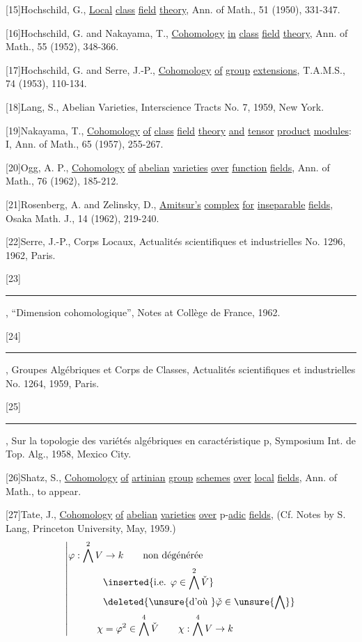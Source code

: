 [15]\quad Hochschild, G., \uline{Local} \uline{class} \uline{field} \uline{theory}, Ann. of Math., 51 (1950), 331-347.

[16]\quad Hochschild, G. and Nakayama, T., \uline{Cohomology} \uline{in} \uline{class} \uline{field} \uline{theory}, Ann. of Math., 55 (1952), 348-366.

[17]\quad Hochschild, G. and Serre, J.-P., \uline{Cohomology} \uline{of} \uline{group} \uline{extensions}, T.A.M.S., 74 (1953), 110-134.

[18]\quad Lang, S., Abelian Varieties, Interscience Tracts No. 7, 1959, New York.

[19]\quad Nakayama, T., \uline{Cohomology} \uline{of} \uline{class} \uline{field} \uline{theory} \uline{and} \uline{tensor} \uline{product} \uline{modules}: I, Ann. of Math., 65 (1957), 255-267.

[20]\quad Ogg, A. P., \uline{Cohomology} \uline{of} \uline{abelian} \uline{varieties} \uline{over} \uline{function} \uline{fields}, Ann. of Math., 76 (1962), 185-212.

[21]\quad Rosenberg, A. and Zelinsky, D., \uline{Amitsur's} \uline{complex} \uline{for} \uline{inseparable} \uline{fields}, Osaka Math. J., 14 (1962), 219-240.

[22]\quad Serre, J.-P., Corps Locaux, Actualités scientifiques et industrielles No. 1296, 1962, Paris.

[23]\quad \rule{4.7em}{.4pt}, \textquotedblleft Dimension cohomologique\textquotedblright, Notes at Collège de France, 1962.

[24]\quad \rule{4.7em}{.4pt}, Groupes Algébriques et Corps de Classes, Actualités scientifiques et industrielles No. 1264, 1959, Paris.

[25]\quad \rule{4.7em}{.4pt}, Sur la topologie des variétés algébriques en caractéristique p, Symposium Int. de Top. Alg., 1958, Mexico City.

[26]\quad Shatz, S., \uline{Cohomology} \uline{of} \uline{artinian} \uline{group} \uline{schemes} \uline{over} \uline{local} \uline{fields}, Ann. of Math., to appear.

[27]\quad Tate, J., \uline{Cohomology} \uline{of} \uline{abelian} \uline{varieties} \uline{over} p-\uline{adic} \uline{fields}, (Cf. Notes by S. Lang, Princeton University, May, 1959.)
\[
\left|\begin{aligned}
\varphi:\bigwedge^2 V&\to k\qquad\text{non dégénérée}\\
&\inserted{\text{i.e. }\varphi\in\bigwedge^2\check V}\\
&\deleted{\unsure{\text{d'où }}\check\varphi\in\unsure{\bigwedge}}\\
\chi&=\varphi^2\in\bigwedge^4\check V\qquad \chi:\bigwedge^4 V\to k
\end{aligned}\right.
\]

